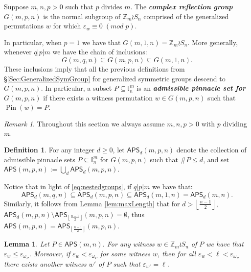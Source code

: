 \documentclass[12pt,reqno]{amsart}
\numberwithin{equation}{section}
\theoremstyle{plain}
\newtheorem{lemma}[theorem]{Lemma}
\theoremstyle{definition}
\newtheorem{definition}[theorem]{Definition}
\theoremstyle{remark}
\newtheorem{remark}[theorem]{Remark}
\newcommand{\Z}{\mathbb{Z}}
\newcommand{\I}{\mathbb{I}}
\newcommand{\Pin}{\operatorname{Pin}}
\newcommand\APS{\mathsf{APS}}
\newcommand{\floor}[1]{\left\lfloor#1\right\rfloor}
\newcommand{\newword}[1]{\emph{\textbf{#1}}}
\begin{document}
Suppose $m,n,p>0$ such that $p$ divides $m$. The \newword{complex reflection group $G(m,p,n)$} is the normal subgroup of $\Z_m \wr S_n$ comprised of the generalized permutations $w$ for which $\varepsilon_w\equiv 0 \;(mod \;p)$.

In particular, when $p=1$ we have that $G(m,1,n)=\Z_m \wr S_n$. 
More generally, whenever $q | p| m$ we have the chain of inclusions:
\begin{equation}\label{eq:nestedgroups}
G(m,q,n) \subseteq G(m,p,n) \subseteq G(m,1,n).
\end{equation}
These inclusions imply that all the previous definitions from \S\ref{Sec:GeneralizedSymGroup} for generalized symmetric groups descend to $G(m,p,n)$. In particular, a subset $P \subseteq \I_n^m$ is an \newword{admissible pinnacle set for $G(m,p,n)$} if there exists a witness permutation $w \in G(m,p,n)$ such that $\Pin(w) = P$. 

\begin{remark}Throughout this section we always assume $m,n,p>0$ with $p$ dividing $m$.\end{remark}

\begin{definition}\label{def:APS-ComplexRflGrp}
For any integer $d\geq 0$, let $\APS_d(m,p,n)$ denote the collection of admissible pinnacle sets $P 
\subseteq \I_n^m$ for $G(m,p,n)$ such that $\#P \leq d$, and set $\APS(m,p,n) := \bigcup_d \APS_d(m,p,n)$.
\end{definition}

Notice that in light of \eqref{eq:nestedgroups}, if $q|p|m$ we have that: 
\begin{equation}\label{eq:APSinclusion}\APS_d(m,q,n)\subseteq \APS_d(m,p,n)
\subseteq \APS_d(m,1,n)=\APS_d(m,n).
\end{equation}
Similarly, it follows from Lemma \ref{lem:maxLength} that for $d>\floor{\frac{n-1}{2}}$, $\APS_d(m,p,n)\setminus \APS_{\floor{\frac{n-1}{2}}}(m,p,n) = \emptyset$, thus $\APS(m,p,n)=\APS_{\floor{\frac{n-1}{2}}}(m,p,n)$.

\begin{lemma}\label{lem:epsilon-range}
    Let $P \in \APS(m,n)$. For any witness $w \in \Z_m \wr S_n$ of $P$ we have that $\varepsilon_w \leq \varepsilon_{\omega_P}$. Moreover, if $\varepsilon_w < \varepsilon_{\omega_P}$ for some witness $w$, then for all $\varepsilon_w< \ell <\varepsilon_{\omega_P}$ there exists another witness $w'$ of $P$ such that $\varepsilon_{w'}=\ell$.
\end{lemma}
\end{document}
